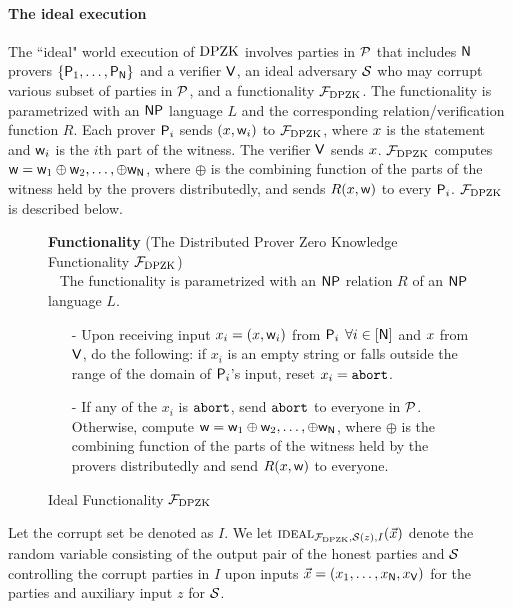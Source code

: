 \paragraph{The ideal execution} The ``ideal" world execution of $\text{DPZK}$  involves parties in $\mathcal{P}$ that includes $\mathsf{N}$ provers $\{\mathsf{P}_1, \ldots, \mathsf{P}_{\mathsf{N}}\}$ and a verifier $\mathsf{V}$,  an ideal adversary $\mathcal{S}$ who may corrupt various subset of parties in $\mathcal{P}$, and a  functionality $\mathcal{F}_{\text{DPZK}}$.  The functionality is parametrized with an  $\mathsf{NP}$ language $L$ and  the corresponding relation/verification function $R$. Each prover $\mathsf{P}_i$ sends $({x},\mathsf{w}_i)$ to $\mathcal{F}_{\text{DPZK}}$, where ${x}$ is the statement and $\mathsf{w}_i$ is the $i$th part of the witness. The verifier $\mathsf{V}$ sends ${x}$.  $\mathcal{F}_{\text{DPZK}}$ computes $\mathsf{w} = \mathsf{w}_1 \oplus \mathsf{w}_2,\ldots,\oplus \mathsf{w}_{\mathsf{N}}$, where $\oplus$ is the combining function of the parts of the witness held by the provers distributedly, and sends $R({x},\mathsf{w})$ to every $\mathsf{P}_i$. $\mathcal{F}_{\text{DPZK}}$  is described below. 
\begin{figure}[h!]
	\centering
	\begin{framed}
		\textbf{Functionality} (The Distributed Prover Zero Knowledge Functionality $\mathcal{F}_{\text{DPZK}}$)\\~
		The functionality is parametrized with an $\mathsf{NP}$ relation $R$ of an $\mathsf{NP}$ language $L$.
		\begin{itemize}
		\item[-] Upon receiving input $x_i = ({x}, \mathsf{w}_i)$ from $\mathsf{P}_i$ $\forall i\in[\mathsf{N}]$ and ${x}$ from $\mathsf{V}$, do the following: if $x_i$ is an empty string or falls outside the range of the domain of $\mathsf{P}_i$'s input,  reset $x_i = \texttt{abort}$. 
			\item[-] If any of the $x_i$ is $\texttt{abort}$, send $\texttt{abort}$ to everyone in $\mathcal{P}$. Otherwise,   compute $\mathsf{w} = \mathsf{w}_1 \oplus \mathsf{w}_2,\ldots, \oplus \mathsf{w}_{\mathsf{N}}$, where $\oplus$ is the combining function of the parts of the witness held by the provers distributedly and send $R({x}, \mathsf{w})$ to everyone. 
		\end{itemize}
	\end{framed}
	\caption{Ideal Functionality $\mathcal{F}_{\text{DPZK}}$}
\end{figure} \label{func:DPZK}
Let the corrupt set be denoted as $I$. We let $\textsc{ideal}_{\mathcal{F}_{\text{DPZK}}, \mathcal{S}(z),I}(\vec{x})$ denote the random variable consisting of the output pair of the honest parties and  $\mathcal{S}$ controlling the corrupt parties in $I$ upon inputs $\vec{x} = (x_1  ,\ldots,x_{\mathsf{N}},x_{\mathsf{V}})$ for the parties and auxiliary input $z$ for $\mathcal{S}$.  


